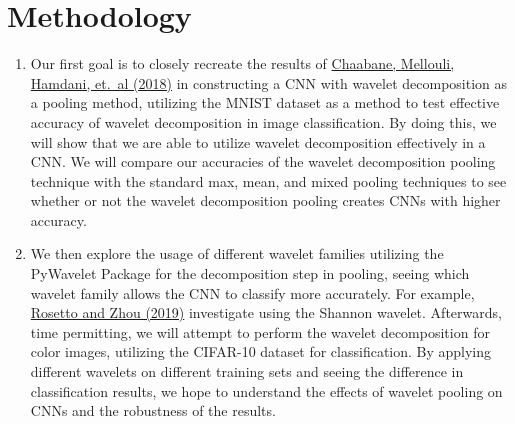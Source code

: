 \documentclass{article}
\begin{document}
\section{Methodology}
\begin{enumerate}
\item Our first goal is to closely recreate the results of \href{https://link.springer.com/chapter/10.1007/978-3-319-76351-4_31}{Chaabane, Mellouli, Hamdani, et.\ al (2018)} in constructing a CNN with wavelet decomposition as a pooling method, utilizing the MNIST dataset as a method to test effective accuracy of wavelet decomposition in image classification. By doing this, we will show that we are able to utilize wavelet decomposition effectively in a CNN. We will compare our accuracies of the wavelet decomposition pooling technique with the standard max, mean, and mixed pooling techniques to see whether or not the wavelet decomposition pooling creates CNNs with higher accuracy. 
\item We then explore the usage of different wavelet families utilizing the PyWavelet Package for the decomposition step in pooling, seeing which wavelet family allows the CNN to classify more accurately. For example, \href{https://easychair.org/publications/download/6Mbb}{Rosetto and Zhou (2019)} investigate using the Shannon wavelet. Afterwards, time permitting, we will attempt to perform the wavelet decomposition for color images, utilizing the CIFAR-10 dataset for classification. By applying different wavelets on different training sets and seeing the difference in classification results, we hope to understand the effects of wavelet pooling on CNNs and the robustness of the results.
\end{enumerate}
\end{document}
